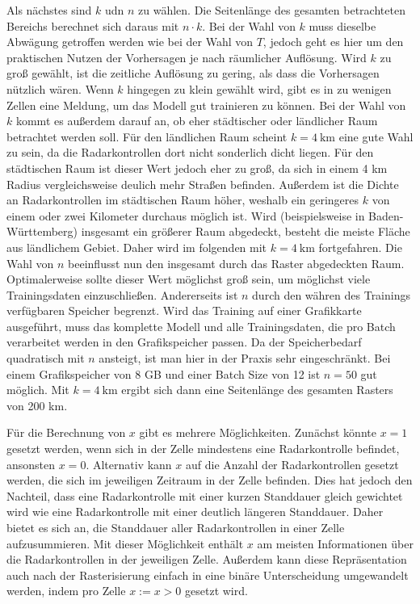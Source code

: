 Als nächstes sind $k$ udn $n$ zu wählen.
Die Seitenlänge des gesamten betrachteten Bereichs berechnet sich daraus mit $n \cdot k$.
Bei der Wahl von $k$ muss dieselbe Abwägung getroffen werden wie bei der Wahl von $T$, jedoch geht es hier um den praktischen Nutzen der Vorhersagen je nach räumlicher Auflösung.
Wird $k$ zu groß gewählt, ist die zeitliche Auflösung zu gering, als dass die Vorhersagen nützlich wären.
Wenn $k$ hingegen zu klein gewählt wird, gibt es in zu wenigen Zellen eine Meldung, um das Modell gut trainieren zu können.
Bei der Wahl von $k$ kommt es außerdem darauf an, ob eher städtischer oder ländlicher Raum betrachtet werden soll.
Für den ländlichen Raum scheint $k = 4~\text{km}$ eine gute Wahl zu sein, da die Radarkontrollen dort nicht sonderlich dicht liegen.
Für den städtischen Raum ist dieser Wert jedoch eher zu groß, da sich in einem 4 km Radius vergleichsweise deulich mehr Straßen befinden.
Außerdem ist die Dichte an Radarkontrollen im städtischen Raum höher, weshalb ein geringeres $k$ von einem oder zwei Kilometer durchaus möglich ist.
Wird (beispielsweise in Baden-Württemberg) insgesamt ein größerer Raum abgedeckt, besteht die meiste Fläche aus ländlichem Gebiet.
Daher wird im folgenden mit $k = 4~\text{km}$ fortgefahren.
Die Wahl von $n$ beeinflusst nun den insgesamt durch das Raster abgedeckten Raum.
Optimalerweise sollte dieser Wert möglichst groß sein, um möglichst viele Trainingsdaten einzuschließen.
Andererseits ist $n$ durch den währen des Trainings verfügbaren Speicher begrenzt.
Wird das Training auf einer Grafikkarte ausgeführt, muss das komplette Modell und alle Trainingsdaten, die pro Batch verarbeitet werden in den Grafikspeicher passen.
Da der Speicherbedarf quadratisch mit $n$ ansteigt, ist man hier in der Praxis sehr eingeschränkt.
Bei einem Grafikspeicher von 8 GB und einer Batch Size von 12 ist $n = 50$ gut möglich.
Mit $k = 4~\text{km}$ ergibt sich dann eine Seitenlänge des gesamten Rasters von 200 km.

Für die Berechnung von $x$ gibt es mehrere Möglichkeiten.
Zunächst könnte $x = 1$ gesetzt werden, wenn sich in der Zelle mindestens eine Radarkontrolle befindet, ansonsten $x = 0$.
Alternativ kann $x$ auf die Anzahl der Radarkontrollen gesetzt werden, die sich im jeweiligen Zeitraum in der Zelle befinden.
Dies hat jedoch den Nachteil, dass eine Radarkontrolle mit einer kurzen Standdauer gleich gewichtet wird wie eine Radarkontrolle mit einer deutlich längeren Standdauer.
Daher bietet es sich an, die Standdauer aller Radarkontrollen in einer Zelle aufzusummieren.
Mit dieser Möglichkeit enthält $x$ am meisten Informationen über die Radarkontrollen in der jeweiligen Zelle.
Außerdem kann diese Repräsentation auch nach der Rasterisierung einfach in eine binäre Unterscheidung umgewandelt werden, indem pro Zelle $x := x > 0$ gesetzt wird.

